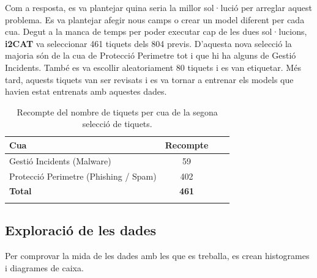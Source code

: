 Com a resposta, es va plantejar quina seria la millor sol·lució per arreglar aquest problema. Es va plantejar afegir nous camps o crear un model diferent per cada cua. Degut a la manca de temps per poder executar cap de les dues sol·lucions, \textbf{i2CAT} va seleccionar 461 tiquets dels 804 previs. D'aquesta nova selecció la majoria són de la cua de Protecció Perimetre tot i que hi ha alguns de Gestió Incidents. També es va escollir aleatoriament 80 tiquets i es van etiquetar. Més tard, aquests tiquets van ser revisats i es va tornar a entrenar els models que havien estat entrenats amb aquestes dades. 

\begin{table}[H]
  \centering
  \begin{tabular}{lccr}
      \Xhline{2\arrayrulewidth}
      \textbf{Cua} & \textbf{Recompte} \\
      \hline
      Gestió Incidents (Malware) & 59 \\
      Protecció Perimetre (Phishing / Spam) & 402  \\
      \hline
      \textbf{Total} & \textbf{461} \\
      \Xhline{2\arrayrulewidth}
  \end{tabular}
  \caption{Recompte del nombre de tiquets per cua de la segona selecció de tiquets.}
  \label{tab:recompte_per_cua_2}
\end{table}

\subsection{Exploració de les dades}
Per comprovar la mida de les dades amb les que es treballa, es crean histogrames i diagrames de caixa.


